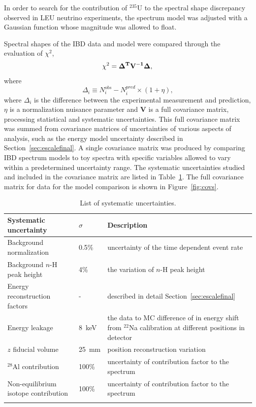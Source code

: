 In order to search for the contribution of $^{235}$U to the spectral shape discrepancy observed in LEU neutrino experiments, the spectrum model was adjusted with a Gaussian function whose magnitude was allowed to float.

Spectral shapes of the IBD data and model were compared through the evaluation of $\chi^2$,
\begin{equation}
\chi^2=  \mathbf{\Delta^{T}}  \mathbf{{V}^{-1}}  \mathbf{\Delta},  \\\nonumber 
\end{equation}
where
\begin{equation}
\Delta_i \equiv N_i^{obs} - N_i^{pred}\times (1 + \eta),
\label{eqn:min_chi2}
\end{equation}
where $\Delta_i$ is the difference between the experimental measurement and prediction, $\eta$ is a normalization nuisance parameter and $\mathbf{V}$ is a full covariance matrix, processing statistical and systematic uncertainties.  
This full covariance matrix was summed from covariance matrices of uncertainties of various aspects of analysis, such as the energy model uncertainty described in Section~\ref{sec:escalefinal}.
A single covariance matrix was produced by comparing IBD spectrum models to toy spectra with specific variables allowed to vary within a predetermined uncertainty range.
The systematic uncertainties studied and included in the covariance matrix are listed in Table~\ref{tab:Covs}.
The full covariance matrix for data for the model comparison is shown in Figure~\ref{fig:covs}.

   \begin{longtable}{p{3cm}p{2cm}p{8cm}}
   	\caption[List of systematic uncertainties]{List of systematic uncertainties.}\\
     \hline 
     \hline 
     Systematic uncertainty & $\sigma$ & Description \\ 
     \hline
     Background normalization & 0.5\% & uncertainty of the time dependent event rate  \\ 
     Background $n$-H peak height & 4\% & the variation of $n$-H peak height \\
     \hline
     Energy reconstruction factors &  - & described in detail Section~\ref{sec:escalefinal}\\
     Energy leakage & 8~keV & the data to MC difference of in energy shift from $^{22}$Na calibration at different positions in detector\\
     \hline
     $z$ fiducial volume & 25~mm & position reconstruction variation\\
     $^{28}$Al contribution & 100\% & uncertainty of contribution factor to the spectrum\\
	Non-equilibrium isotope contribution & 100\% & uncertainty of contribution factor to the spectrum\\
     \hline
     \label{tab:Covs}   
   \end{longtable}
   
